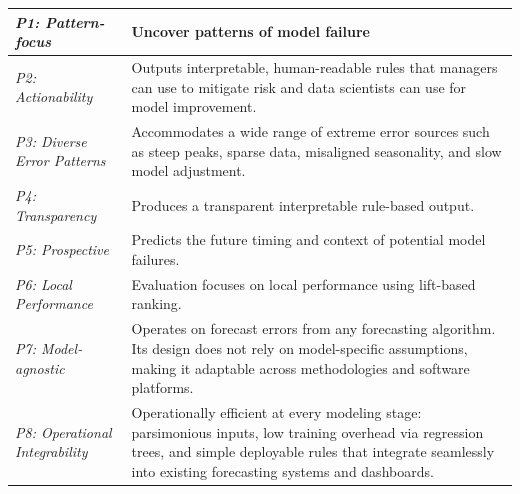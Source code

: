 \documentclass[12pt]{article}
\let\oldtable\table
\let\endoldtable\endtable
\renewenvironment{table}
  {\oldtable\spacingset{1}}
  {\endoldtable}
\begin{document}
\begin{table}
\centering
\caption{\textit{How TreeAlert Embodies the Design Principles for Pattern-Based Error Prediction}}
\small
\begin{tabular}{|m{3cm}|m{12.4cm}|}
\hline
\centering\textit{P1: Pattern-focus} &
Uncover patterns of model failure \\
\hline
\centering\textit{P2: Actionability} &
Outputs interpretable, human-readable rules that managers can use to mitigate risk and data scientists can use for model improvement. \\
\hline
\centering\textit{P3: Diverse Error Patterns} &
Accommodates a wide range of extreme error sources such as steep peaks, sparse data, misaligned seasonality, and slow model adjustment. \\
\hline
\centering\textit{P4: Transparency} &
Produces a transparent interpretable rule-based output. \\
\hline
\centering\textit{P5: Prospective} &
Predicts the future timing and context of potential model failures. \\
\hline
\centering\textit{P6: Local Performance} &
Evaluation focuses on local performance using lift-based ranking. \\
\hline
\centering\textit{P7: Model-agnostic} &
Operates on forecast errors from any forecasting algorithm. Its design does not rely on model-specific assumptions, making it adaptable across methodologies and software platforms. \\
\hline
\centering\textit{P8: Operational Integrability} &
Operationally efficient at every modeling stage: parsimonious inputs, low training overhead via regression trees, and simple deployable rules that integrate seamlessly into existing forecasting systems and dashboards. \\
\hline
\end{tabular}
\label{tab:design}
\end{table}

\FloatBarrier


\end{document}
